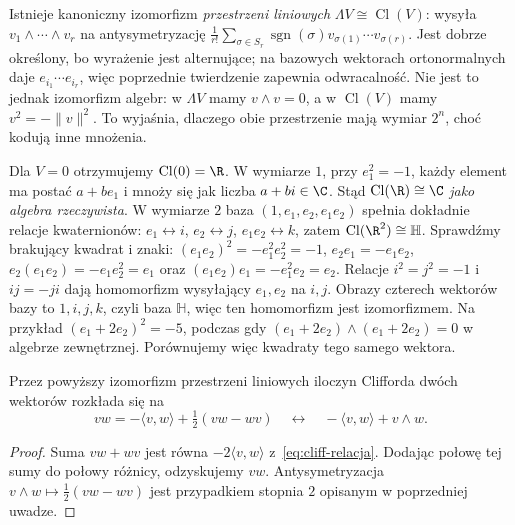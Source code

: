 \begin{uwaga}
\label{rem:cliff-zewnetrzna}
Istnieje kanoniczny izomorfizm \emph{przestrzeni liniowych}
$\Lambda V\cong\operatorname{Cl}(V)$: wysyła
$v_1\wedge\cdots\wedge v_r$ na antysymetryzację
$\frac1{r!}\sum_{\sigma\in S_r}\operatorname{sgn}(\sigma)
 v_{\sigma(1)}\cdots v_{\sigma(r)}$.
Jest dobrze określony, bo wyrażenie jest alternujące;
na bazowych wektorach ortonormalnych daje
$e_{i_1}\cdots e_{i_r}$, więc poprzednie twierdzenie
zapewnia odwracalność. Nie jest to jednak izomorfizm
algebr: w $\Lambda V$ mamy $v\wedge v=0$,
a w $\operatorname{Cl}(V)$ mamy
$v^2=-\|v\|^2$. To wyjaśnia, dlaczego obie
przestrzenie mają wymiar $2^n$, choć kodują
inne mnożenia.
\end{uwaga}

\begin{przyklad}[Wymiary $0$, $1$ i $2$]
Dla $V=0$ otrzymujemy $\operatorname{Cl}(0)=\R$.
W wymiarze $1$, przy $e_1^2=-1$, każdy element
ma postać $a+be_1$ i mnoży się jak liczba
$a+bi\in\C$. Stąd $\operatorname{Cl}(\R)\cong\C$
\emph{jako algebra rzeczywista}.
W wymiarze $2$ baza $(1,e_1,e_2,e_1e_2)$
spełnia dokładnie relacje kwaternionów:
$e_1\leftrightarrow i$, $e_2\leftrightarrow j$,
$e_1e_2\leftrightarrow k$, zatem
$\operatorname{Cl}(\R^2)\cong\mathbb H$.
Sprawdźmy brakujący kwadrat i znaki:
$(e_1e_2)^2=-e_1^2e_2^2=-1$,
$e_2e_1=-e_1e_2$,
$e_2(e_1e_2)=-e_1e_2^2=e_1$ oraz
$(e_1e_2)e_1=-e_1^2e_2=e_2$.
Relacje $i^2=j^2=-1$ i $ij=-ji$ dają homomorfizm
wysyłający $e_1,e_2$ na $i,j$.
Obrazy czterech wektorów bazy to $1,i,j,k$, czyli baza
$\mathbb H$, więc ten homomorfizm jest izomorfizmem.
Na przykład $(e_1+2e_2)^2=-5$, podczas gdy
$(e_1+2e_2)\wedge(e_1+2e_2)=0$
w algebrze zewnętrznej. Porównujemy więc kwadraty tego samego wektora.
\end{przyklad}

\begin{stwierdzenie}
\label{prop:cliff-wedge}
Przez powyższy izomorfizm przestrzeni liniowych
iloczyn Clifforda dwóch wektorów rozkłada się na
\begin{equation}\label{eq:cliff-rozdzial}
 vw=-\langle v,w\rangle
       +\tfrac12(vw-wv)
 \quad\longleftrightarrow\quad
 -\langle v,w\rangle+v\wedge w.
\end{equation}
\end{stwierdzenie}
\begin{proof}
Suma $vw+wv$ jest równa
$-2\langle v,w\rangle$ z~\eqref{eq:cliff-relacja}.
Dodając połowę tej sumy do połowy różnicy,
odzyskujemy $vw$. Antysymetryzacja
$v\wedge w\mapsto\tfrac12(vw-wv)$
jest przypadkiem stopnia $2$ opisanym w
poprzedniej uwadze.
\end{proof}

